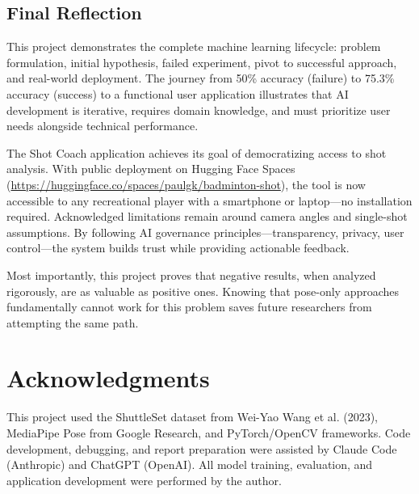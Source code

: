 \documentclass[11pt,a4paper]{article}
\begin{document}
\subsection{Final Reflection}

This project demonstrates the complete machine learning lifecycle: problem formulation, initial hypothesis, failed experiment, pivot to successful approach, and real-world deployment. The journey from 50\% accuracy (failure) to 75.3\% accuracy (success) to a functional user application illustrates that AI development is iterative, requires domain knowledge, and must prioritize user needs alongside technical performance.

The Shot Coach application achieves its goal of democratizing access to shot analysis. With public deployment on Hugging Face Spaces (\url{https://huggingface.co/spaces/paulgk/badminton-shot}), the tool is now accessible to any recreational player with a smartphone or laptop---no installation required. Acknowledged limitations remain around camera angles and single-shot assumptions. By following AI governance principles---transparency, privacy, user control---the system builds trust while providing actionable feedback.

Most importantly, this project proves that negative results, when analyzed rigorously, are as valuable as positive ones. Knowing that pose-only approaches fundamentally cannot work for this problem saves future researchers from attempting the same path.

\section*{Acknowledgments}

This project used the ShuttleSet dataset from Wei-Yao Wang et al. (2023), MediaPipe Pose from Google Research, and PyTorch/OpenCV frameworks. Code development, debugging, and report preparation were assisted by Claude Code (Anthropic) and ChatGPT (OpenAI). All model training, evaluation, and application development were performed by the author.
\end{document}
